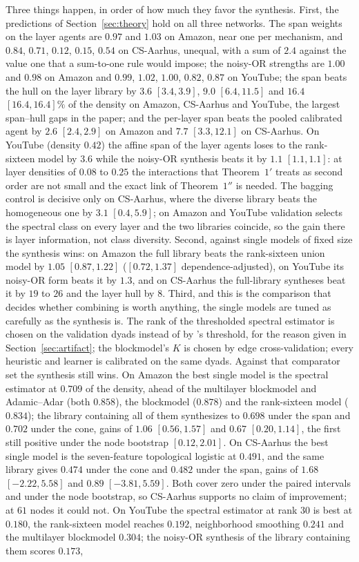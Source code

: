 \documentclass[12pt]{article}
\begin{document}
Three things happen, in order of how much they favor the synthesis. First, the predictions of Section~\ref{sec:theory} hold on all three networks. The span weights on the layer agents are $0.97$ and $1.03$ on Amazon, near one per mechanism, and $0.84$, $0.71$, $0.12$, $0.15$, $0.54$ on CS-Aarhus, unequal, with a sum of $2.4$ against the value one that a sum-to-one rule would impose; the noisy-OR strengths are $1.00$ and $0.98$ on Amazon and $0.99$, $1.02$, $1.00$, $0.82$, $0.87$ on YouTube; the span beats the hull on the layer library by $3.6$ $[3.4,3.9]$, $9.0$ $[6.4,11.5]$ and $16.4$ $[16.4,16.4]\%$ of the density on Amazon, CS-Aarhus and YouTube, the largest span--hull gaps in the paper; and the per-layer span beats the pooled calibrated agent by $2.6$ $[2.4,2.9]$ on Amazon and $7.7$ $[3.3,12.1]$ on CS-Aarhus. On YouTube (density $0.42$) the affine span of the layer agents loses to the rank-sixteen model by $3.6$ while the noisy-OR synthesis beats it by $1.1$ $[1.1,1.1]$: at layer densities of $0.08$ to $0.25$ the interactions that Theorem~$1'$ treats as second order are not small and the exact link of Theorem~$1''$ is needed. The bagging control is decisive only on CS-Aarhus, where the diverse library beats the homogeneous one by $3.1$ $[0.4,5.9]$; on Amazon and YouTube validation selects the spectral class on every layer and the two libraries coincide, so the gain there is layer information, not class diversity. Second, against single models of fixed size the synthesis wins: on Amazon the full library beats the rank-sixteen union model by $1.05$ $[0.87,1.22]$ ($[0.72,1.37]$ dependence-adjusted), on YouTube its noisy-OR form beats it by $1.3$, and on CS-Aarhus the full-library syntheses beat it by $19$ to $26$ and the layer hull by $8$. Third, and this is the comparison that decides whether combining is worth anything, the single models are tuned as carefully as the synthesis is. The rank of the thresholded spectral estimator is chosen on the validation dyads instead of by \citeauthor{Chatterjee2015}'s threshold, for the reason given in Section~\ref{sec:artifact}; the blockmodel's $K$ is chosen by edge cross-validation; every heuristic and learner is calibrated on the same dyads. Against that comparator set the synthesis still wins. On Amazon the best single model is the spectral estimator at $0.709$ of the density, ahead of the multilayer blockmodel and Adamic--Adar (both $0.858$), the blockmodel ($0.878$) and the rank-sixteen model ($0.834$); the library containing all of them synthesizes to $0.698$ under the span and $0.702$ under the cone, gains of $1.06$ $[0.56,1.57]$ and $0.67$ $[0.20,1.14]$, the first still positive under the node bootstrap $[0.12,2.01]$. On CS-Aarhus the best single model is the seven-feature topological logistic at $0.491$, and the same library gives $0.474$ under the cone and $0.482$ under the span, gains of $1.68$ $[-2.22,5.58]$ and $0.89$ $[-3.81,5.59]$. Both cover zero under the paired intervals and under the node bootstrap, so CS-Aarhus supports no claim of improvement; at $61$ nodes it could not. On YouTube the spectral estimator at rank $30$ is best at $0.180$, the rank-sixteen model reaches $0.192$, neighborhood smoothing $0.241$ and the multilayer blockmodel $0.304$; the noisy-OR synthesis of the library containing them scores $0.173$, 
\end{document}
